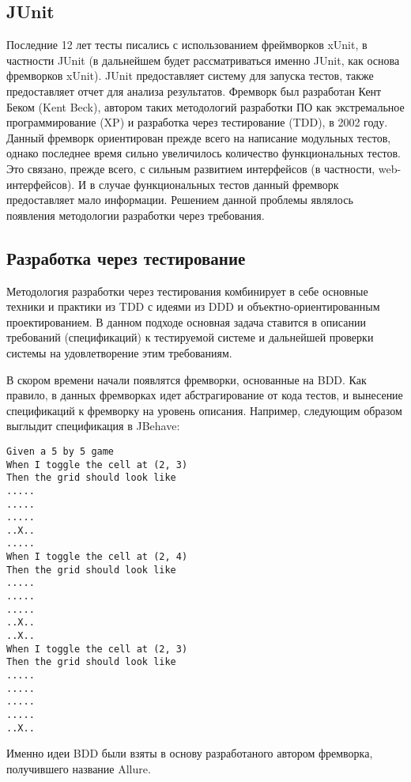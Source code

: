 \subsection{JUnit}

Последние 12 лет тесты писались с использованием фреймворков xUnit, в частности JUnit (в дальнейшем будет рассматриваться именно JUnit, как основа фремворков xUnit). JUnit предоставляет систему для запуска тестов, также предоставляет отчет для анализа результатов. 
Фремворк был разработан Кент Беком (Kent Beck), автором таких методологий разработки ПО как экстремальное программирование (XP) и разработка через тестирование (TDD), в 2002 году. 
Данный фремворк ориентирован прежде всего на написание модульных тестов, однако последнее время сильно увеличилось количество функциональных тестов. Это связано, прежде всего, с сильным развитием интерфейсов (в частности, web-интерфейсов). И в случае функциональных тестов данный фремворк предоставляет мало информации. Решением данной проблемы являлось появления методологии разработки через требования.

\subsection{Разработка через тестирование}

Методология разработки через тестирования комбинирует в себе основные техники и практики из TDD с идеями из DDD и объектно-ориентированным проектированием. В данном подходе основная задача ставится в описании требований (спецификаций) к тестируемой системе и дальнейшей проверки системы на удовлетворение этим требованиям. 

В скором времени начали появлятся фремворки, основанные на BDD. Как правило, в данных фремворках идет абстрагирование от кода тестов, и вынесение спецификаций к фремворку на уровень описания. Например, следующим образом выглыдит спецификация в JBehave:

\begin{lstlisting}
Given a 5 by 5 game
When I toggle the cell at (2, 3)
Then the grid should look like
.....
.....
.....
..X..
.....
When I toggle the cell at (2, 4)
Then the grid should look like
.....
.....
.....
..X..
..X..
When I toggle the cell at (2, 3)
Then the grid should look like
.....
.....
.....
.....
..X..
\end{lstlisting}

Именно идеи BDD были взяты в основу разработаного автором фремворка, получившего название Allure.

